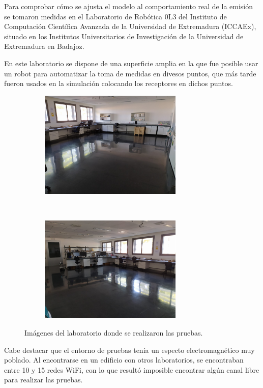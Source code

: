 Para comprobar cómo se ajusta el modelo al comportamiento real de la emisión se tomaron medidas en el Laboratorio de Robótica 0L3 del Instituto de Computación Científica Avanzada de la Universidad de Extremadura (ICCAEx), situado en los Institutos Universitarios de Investigación de la Universidad de Extremadura en Badajoz.

En este laboratorio se dispone de una superficie amplia en la que fue posible usar un robot para automatizar la toma de medidas en divesos puntos, que más tarde fueron usados en la simulación colocando los receptores en dichos puntos.

\begin{figure}[H]
    \centering
    \begin{subfigure}[b]{0.45\textwidth}
        \centering
        \includegraphics[width=6.8cm]{pic/lab1.jpg}
    \end{subfigure}
    ~~
    \begin{subfigure}[b]{0.45\textwidth}
        \centering
        \includegraphics[width=6.8cm]{pic/lab2.jpg}
    \end{subfigure}
    \caption{Imágenes del laboratorio donde se realizaron las pruebas.}
    \label{fig:lab_pics}
\end{figure}


Cabe destacar que el entorno de pruebas tenía un especto electromagnético muy poblado.
Al encontrarse en un edificio con otros laboratorios, se encontraban entre 10 y 15 redes WiFi, con lo que resultó imposible encontrar algún canal libre para realizar las pruebas.

